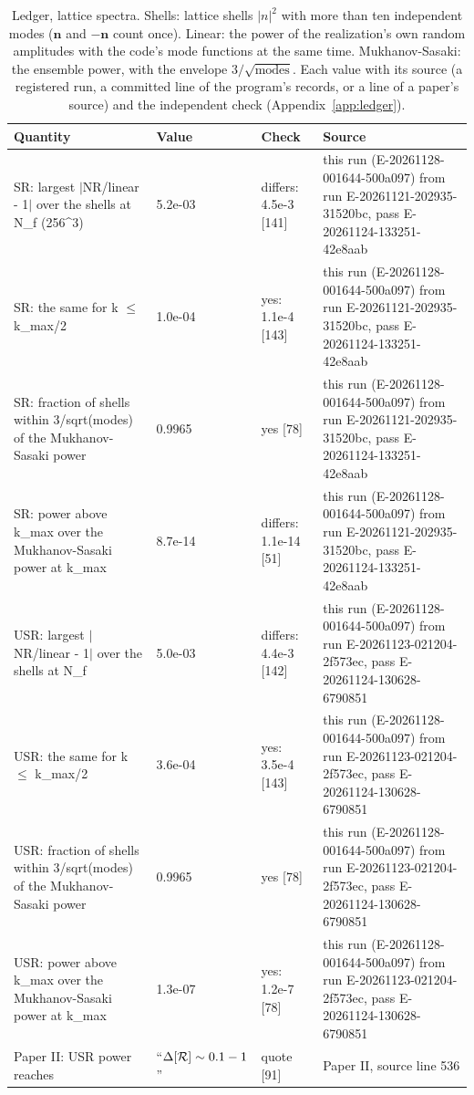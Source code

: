 \begin{table}
\caption{Ledger, lattice spectra. Shells: lattice shells $|n|^2$ with more than ten independent modes ($\bm n$ and $-\bm n$ count once). Linear: the power of the realization's own random amplitudes with the code's mode functions at the same time. Mukhanov-Sasaki: the ensemble power, with the envelope $3/\sqrt{\mathrm{modes}}$. Each value with its source (a registered run, a committed line of the program's records, or a line of a paper's source) and the independent check (Appendix~\ref{app:ledger}).}
\label{tab:ledgerlatticespectra}
\footnotesize
\begin{tabular}{p{}p{}p{}p{}}
\toprule
Quantity & Value & Check & Source \\
\midrule
SR: largest $|$NR/\allowbreak{}linear - 1$|$ over the shells at N\_f (256\^{}3) & 5.2e-03 & differs: 4.5e-3 [141] & this run (E-20261128-001644-500a097) from run E-20261121-202935-31520bc, pass E-20261124-133251-42e8aab \\
SR: the same for k $\le$ k\_max/\allowbreak{}2 & 1.0e-04 & yes: 1.1e-4 [143] & this run (E-20261128-001644-500a097) from run E-20261121-202935-31520bc, pass E-20261124-133251-42e8aab \\
SR: fraction of shells within 3/\allowbreak{}sqrt(modes) of the Mukhanov-Sasaki power & 0.9965 & yes [78] & this run (E-20261128-001644-500a097) from run E-20261121-202935-31520bc, pass E-20261124-133251-42e8aab \\
SR: power above k\_max over the Mukhanov-Sasaki power at k\_max & 8.7e-14 & differs: 1.1e-14 [51] & this run (E-20261128-001644-500a097) from run E-20261121-202935-31520bc, pass E-20261124-133251-42e8aab \\
USR: largest $|$NR/\allowbreak{}linear - 1$|$ over the shells at N\_f & 5.0e-03 & differs: 4.4e-3 [142] & this run (E-20261128-001644-500a097) from run E-20261123-021204-2f573ec, pass E-20261124-130628-6790851 \\
USR: the same for k $\le$ k\_max/\allowbreak{}2 & 3.6e-04 & yes: 3.5e-4 [143] & this run (E-20261128-001644-500a097) from run E-20261123-021204-2f573ec, pass E-20261124-130628-6790851 \\
USR: fraction of shells within 3/\allowbreak{}sqrt(modes) of the Mukhanov-Sasaki power & 0.9965 & yes [78] & this run (E-20261128-001644-500a097) from run E-20261123-021204-2f573ec, pass E-20261124-130628-6790851 \\
USR: power above k\_max over the Mukhanov-Sasaki power at k\_max & 1.3e-07 & yes: 1.2e-7 [78] & this run (E-20261128-001644-500a097) from run E-20261123-021204-2f573ec, pass E-20261124-130628-6790851 \\
Paper II: USR power reaches & ``$\Delta[{\cal R}]\sim 0.1-1$'' & quote [91] & Paper II, source line 536 \\
\bottomrule
\end{tabular}
\end{table}

